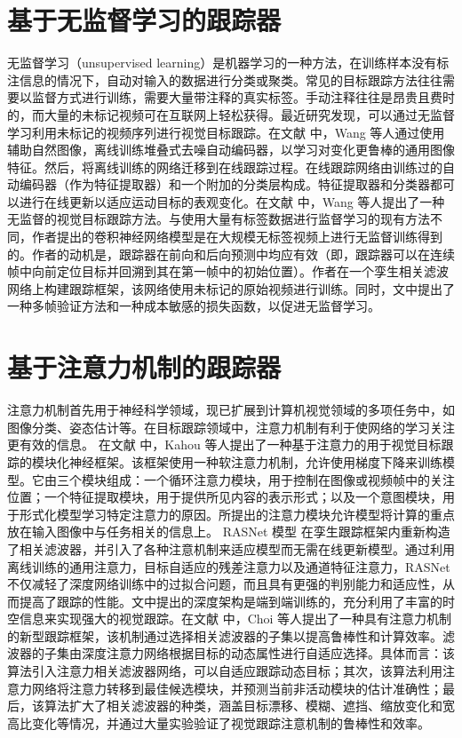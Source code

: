 \section{基于无监督学习的跟踪器}
无监督学习（unsupervised learning）是机器学习的一种方法，在训练样本没有标注信息的情况下，自动对输入的数据进行分类或聚类。常见的目标跟踪方法往往需要以监督方式进行训练，需要大量带注释的真实标签。手动注释往往是昂贵且费时的，而大量的未标记视频可在互联网上轻松获得。最近研究发现，可以通过无监督学习利用未标记的视频序列进行视觉目标跟踪。在文献 \cite{wang2013learning} 中，Wang 等人通过使用辅助自然图像，离线训练堆叠式去噪自动编码器，以学习对变化更鲁棒的通用图像特征。然后，将离线训练的网络迁移到在线跟踪过程。在线跟踪网络由训练过的自动编码器（作为特征提取器）和一个附加的分类层构成。特征提取器和分类器都可以进行在线更新以适应运动目标的表观变化。在文献 \cite{wang2019unsupervised} 中，Wang 等人提出了一种无监督的视觉目标跟踪方法。与使用大量有标签数据进行监督学习的现有方法不同，作者提出的卷积神经网络模型是在大规模无标签视频上进行无监督训练得到的。作者的动机是，跟踪器在前向和后向预测中均应有效（即，跟踪器可以在连续帧中向前定位目标并回溯到其在第一帧中的初始位置）。作者在一个孪生相关滤波网络上构建跟踪框架，该网络使用未标记的原始视频进行训练。同时，文中提出了一种多帧验证方法和一种成本敏感的损失函数，以促进无监督学习。
\section{基于注意力机制的跟踪器}
注意力机制首先用于神经科学领域，现已扩展到计算机视觉领域的多项任务中，如图像分类、姿态估计等。在目标跟踪领域中，注意力机制有利于使网络的学习关注更有效的信息。
在文献 \cite{RATM} 中，Kahou 等人提出了一种基于注意力的用于视觉目标跟踪的模块化神经框架。该框架使用一种软注意力机制，允许使用梯度下降来训练模型。它由三个模块组成：一个循环注意力模块，用于控制在图像或视频帧中的关注位置；一个特征提取模块，用于提供所见内容的表示形式；以及一个意图模块，用于形式化模型学习特定注意力的原因。所提出的注意力模块允许模型将计算的重点放在输入图像中与任务相关的信息上。%
RASNet 模型 \cite{wang2018learning} 在孪生跟踪框架内重新构造了相关滤波器，并引入了各种注意机制来适应模型而无需在线更新模型。通过利用离线训练的通用注意力，目标自适应的残差注意力以及通道特征注意力，RASNet 不仅减轻了深度网络训练中的过拟合问题，而且具有更强的判别能力和适应性，从而提高了跟踪的性能。文中提出的深度架构是端到端训练的，充分利用了丰富的时空信息来实现强大的视觉跟踪。在文献 \cite{choi2017attentional} 中，Choi 等人提出了一种具有注意力机制的新型跟踪框架，该机制通过选择相关滤波器的子集以提高鲁棒性和计算效率。滤波器的子集由深度注意力网络根据目标的动态属性进行自适应选择。具体而言：该算法引入注意力相关滤波器网络，可以自适应跟踪动态目标；其次，该算法利用注意力网络将注意力转移到最佳候选模块，并预测当前非活动模块的估计准确性；最后，该算法扩大了相关滤波器的种类，涵盖目标漂移、模糊、遮挡、缩放变化和宽高比变化等情况，并通过大量实验验证了视觉跟踪注意机制的鲁棒性和效率。
